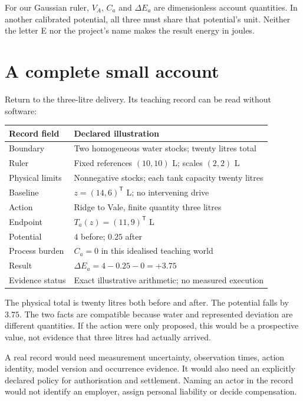 For our Gaussian ruler, $V_A$, $C_a$ and $\Delta E_a$ are dimensionless account quantities. In another calibrated potential, all three must share that potential's unit. Neither the letter E nor the project's name makes the result energy in joules.

\section{A complete small account}
Return to the three-litre delivery. Its teaching record can be read without software:

\begin{center}\small
\begin{tabular}{@{}p{107pt}p{239pt}@{}}
\toprule
Record field & Declared illustration\\
\midrule
Boundary & Two homogeneous water stocks; twenty litres total\\
Ruler & Fixed references $(10,10)$ L; scales $(2,2)$ L\\
Physical limits & Nonnegative stocks; each tank capacity twenty litres\\
Baseline & $z=(14,6)^{\mathsf T}$ L; no intervening drive\\
Action & Ridge to Vale, finite quantity three litres\\
Endpoint & $T_a(z)=(11,9)^{\mathsf T}$ L\\
Potential & $4$ before; $0.25$ after\\
Process burden & $C_a=0$ in this idealised teaching world\\
Result & $\Delta E_a=4-0.25-0=+3.75$\\
Evidence status & Exact illustrative arithmetic; no measured execution\\
\bottomrule
\end{tabular}
\end{center}

The physical total is twenty litres both before and after. The potential falls by $3.75$. The two facts are compatible because water and represented deviation are different quantities. If the action were only proposed, this would be a prospective value, not evidence that three litres had actually arrived.

A real record would need measurement uncertainty, observation times, action identity, model version and occurrence evidence. It would also need an explicitly declared policy for authorisation and settlement. Naming an actor in the record would not identify an employer, assign personal liability or decide compensation.

